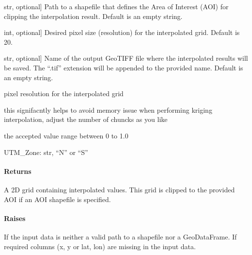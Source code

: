 \documentclass[letterpaper,10pt,english]{sphinxmanual}
\begin{document}
\begin{fulllineitems}
\begin{description}
\sphinxlineitem{aoi\_shapefile}{[}str, optional{]}
\sphinxAtStartPar
Path to a shapefile that defines the Area of Interest (AOI) for clipping the interpolation result. 
Default is an empty string.

\sphinxlineitem{pixel\_size}{[}int, optional{]}
\sphinxAtStartPar
Desired pixel size (resolution) for the interpolated grid. Default is 20.

\sphinxlineitem{out\_fileName}{[}str, optional{]}
\sphinxAtStartPar
Name of the output GeoTIFF file where the interpolated results will be saved. 
The “.tif” extension will be appended to the provided name. Default is an empty string.

\sphinxAtStartPar
pixel resolution for the interpolated grid

\sphinxAtStartPar
this signifacntly helps to avoid memory issue when performing kriging interpolation, adjust the number of chuncks as you like

\sphinxAtStartPar
the accepted value range between 0 to 1.0

\end{description}

\sphinxAtStartPar
UTM\_Zone: str, “N” or “S”


\paragraph{Returns}
\label{\detokenize{akhdefo_functions:id22}}\begin{description}
\sphinxAtStartPar
A 2D grid containing interpolated values. This grid is clipped to the provided AOI if an 
AOI shapefile is specified.

\end{description}


\paragraph{Raises}
\label{\detokenize{akhdefo_functions:raises}}\begin{description}
\sphinxAtStartPar
If the input data is neither a valid path to a shapefile nor a GeoDataFrame.
If required columns (x, y or lat, lon) are missing in the input data.

\end{description}



\end{fulllineitems}
\end{document}
